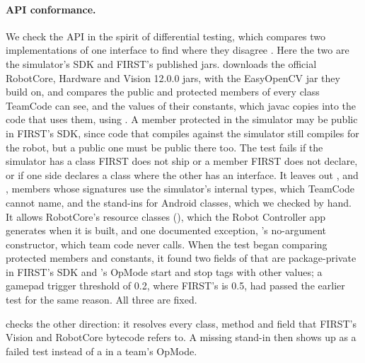 \documentclass[10pt,twocolumn,letterpaper]{article}
\begin{document}
\paragraph{API conformance.} We check the API in the spirit of differential testing, which compares two implementations of one interface to find where they disagree \citep{mckeeman1998differential}. Here the two are the simulator's SDK and FIRST's published jars.  downloads the official RobotCore, Hardware and Vision 12.0.0 jars, with the EasyOpenCV jar they build on, and compares the public and protected members of every class TeamCode can see, and the values of their constants, which javac copies into the code that uses them, using . A member protected in the simulator may be public in FIRST's SDK, since code that compiles against the simulator still compiles for the robot, but a public one must be public there too. The test fails if the simulator has a class FIRST does not ship or a member FIRST does not declare, or if one side declares a class where the other has an interface. It leaves out ,  and , members whose signatures use the simulator's internal  types, which TeamCode cannot name, and the stand-ins for Android classes, which we checked by hand. It allows RobotCore's resource classes (), which the Robot Controller app generates when it is built, and one documented exception, 's no-argument constructor, which team code never calls. When the test began comparing protected members and constants, it found two fields of  that are package-private in FIRST's SDK and 's OpMode start and stop tags with other values; a gamepad trigger threshold of 0.2, where FIRST's is 0.5, had passed the earlier test for the same reason. All three are fixed.

 checks the other direction: it resolves every class, method and field that FIRST's Vision and RobotCore bytecode refers to. A missing stand-in then shows up as a failed test instead of a  in a team's OpMode.
\end{document}
